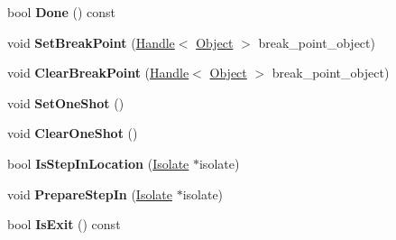 \begin{DoxyCompactItemize}
\item 
\hypertarget{classv8_1_1internal_1_1_break_location_iterator_a0d00e131563e16ced03920ced149dc39}{}bool {\bfseries Done} () const \label{classv8_1_1internal_1_1_break_location_iterator_a0d00e131563e16ced03920ced149dc39}

\item 
\hypertarget{classv8_1_1internal_1_1_break_location_iterator_a7dbf51add37d7ec4df4a681a4522cd28}{}void {\bfseries Set\+Break\+Point} (\hyperlink{classv8_1_1internal_1_1_handle}{Handle}$<$ \hyperlink{classv8_1_1internal_1_1_object}{Object} $>$ break\+\_\+point\+\_\+object)\label{classv8_1_1internal_1_1_break_location_iterator_a7dbf51add37d7ec4df4a681a4522cd28}

\item 
\hypertarget{classv8_1_1internal_1_1_break_location_iterator_a1373fe615e1fc5386b0617c2d611a6e4}{}void {\bfseries Clear\+Break\+Point} (\hyperlink{classv8_1_1internal_1_1_handle}{Handle}$<$ \hyperlink{classv8_1_1internal_1_1_object}{Object} $>$ break\+\_\+point\+\_\+object)\label{classv8_1_1internal_1_1_break_location_iterator_a1373fe615e1fc5386b0617c2d611a6e4}

\item 
\hypertarget{classv8_1_1internal_1_1_break_location_iterator_afe2727b78b8f61e70f6eb8b22de0ccd8}{}void {\bfseries Set\+One\+Shot} ()\label{classv8_1_1internal_1_1_break_location_iterator_afe2727b78b8f61e70f6eb8b22de0ccd8}

\item 
\hypertarget{classv8_1_1internal_1_1_break_location_iterator_a12f4389ca96efcd3fa859ef92197fbc6}{}void {\bfseries Clear\+One\+Shot} ()\label{classv8_1_1internal_1_1_break_location_iterator_a12f4389ca96efcd3fa859ef92197fbc6}

\item 
\hypertarget{classv8_1_1internal_1_1_break_location_iterator_a8883ff068a5173c5b3ba2daf9cbc6272}{}bool {\bfseries Is\+Step\+In\+Location} (\hyperlink{classv8_1_1internal_1_1_isolate}{Isolate} $\ast$isolate)\label{classv8_1_1internal_1_1_break_location_iterator_a8883ff068a5173c5b3ba2daf9cbc6272}

\item 
\hypertarget{classv8_1_1internal_1_1_break_location_iterator_ab15d60d1700c65cc57614a27fc48dae0}{}void {\bfseries Prepare\+Step\+In} (\hyperlink{classv8_1_1internal_1_1_isolate}{Isolate} $\ast$isolate)\label{classv8_1_1internal_1_1_break_location_iterator_ab15d60d1700c65cc57614a27fc48dae0}

\item 
\hypertarget{classv8_1_1internal_1_1_break_location_iterator_ae3a14377310186b42b3b9700c6d1e2d2}{}bool {\bfseries Is\+Exit} () const \label{classv8_1_1internal_1_1_break_location_iterator_ae3a14377310186b42b3b9700c6d1e2d2}


\end{DoxyCompactItemize}
